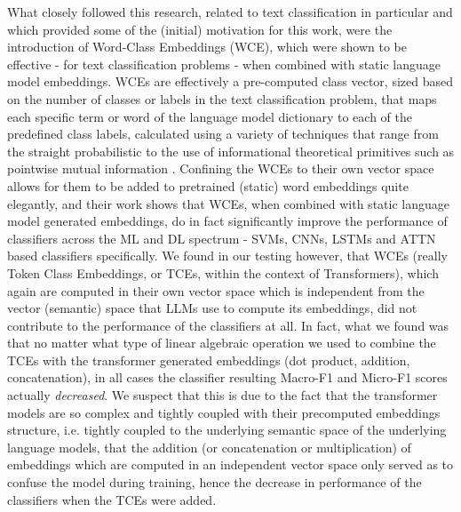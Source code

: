 \documentclass[final]{clv2025-revised}
\begin{document}
What closely followed this research, related to text classification in particular and which provided some of the (initial) motivation for this work, were the introduction of Word-Class Embeddings (WCE), which were shown to be effective - for text classification problems - when combined with static language model embeddings. WCEs are effectively a pre-computed class vector, sized based on the number of classes or labels in the text classification problem, that maps each specific term or word of the language model dictionary to each of the predefined class labels, calculated using a variety of techniques that range from the straight probabilistic to the use of informational theoretical primitives such as pointwise mutual information \cite{moreo2021}. Confining the WCEs to their own vector space allows for them to be added to pretrained (static) word embeddings quite elegantly, and their work shows that WCEs, when combined with static language model generated embeddings, do in fact significantly improve the performance of classifiers across the ML and DL spectrum - SVMs, CNNs, LSTMs and ATTN based classifiers specifically. We found in our testing however, that WCEs (really Token Class Embeddings, or TCEs, within the context of Transformers), which again are computed in their own vector space which is independent from the vector (semantic) space that LLMs use to compute its embeddings, did not contribute to the performance of the classifiers at all. In fact, what we found was that no matter what type of linear algebraic operation we used to combine the TCEs with the transformer generated embeddings (dot product, addition, concatenation), in all cases the classifier resulting Macro-F1 and Micro-F1 scores actually \textit{decreased}. We suspect that this is due to the fact that the transformer models are so complex and tightly coupled with their precomputed embeddings structure, i.e. tightly coupled to the underlying semantic space of the underlying language models, that the addition (or concatenation or multiplication) of embeddings which are computed in an independent vector space only served as to confuse the model during training, hence the decrease in performance of the classifiers when the TCEs were added. 
\end{document}
